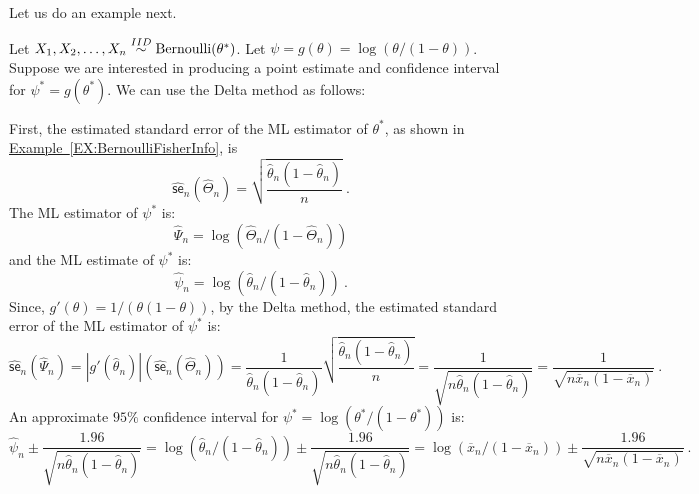 Let us do an example next.
\begin{example}
Let $X_1,X_2,\ldots,X_n \overset{IID}{\sim} \mbox{{\rm Bernoulli}}(\theta^*)$.  Let $\psi=g(\theta)=\log(\theta/(1-\theta))$.  Suppose we are interested in producing a point estimate and confidence interval for $\psi^*=g(\theta^*)$.  We can use the Delta method as follows: 

First, the estimated standard error of the ML estimator of $\theta^*$, as shown in \hyperref[EX:BernoulliFisherInfo]{Example~\ref*{EX:BernoulliFisherInfo}}, is
\[
\widehat{\mathsf{se}}_n(\widehat{\Theta}_n) = \sqrt{\frac{\widehat{\theta}_n (1-\widehat{\theta}_n)}{n}} \ .
\]
The ML estimator of $\psi^*$ is:
$$\widehat{\Psi}_n=\log(\widehat{\Theta}_n / (1-\widehat{\Theta}_n))$$ 
and the ML estimate of $\psi^*$ is:
$$\widehat{\psi}_n=\log(\widehat{\theta}_n / (1-\widehat{\theta}_n)) \ .$$
Since, $g'(\theta) = 1/(\theta (1-\theta))$, by the Delta method, the estimated standard error of the ML estimator of $\psi^*$ is:
\[
\widehat{\mathsf{se}}_n(\widehat{\Psi}_n) = |g'(\widehat{\theta}_n)| (\widehat{\mathsf{se}}_n(\widehat{\Theta}_n))
= \frac{1}{\widehat{\theta}_n (1-\widehat{\theta}_n)} \sqrt{\frac{\widehat{\theta}_n (1-\widehat{\theta}_n)}{n}}
= \frac{1}{\sqrt{n\widehat{\theta}_n (1-\widehat{\theta}_n)}}
= \frac{1}{\sqrt{n \overline{x}_n (1-\overline{x}_n)}} \ .
\]
An approximate $95\%$ confidence interval for $\psi^*=\log(\theta^*/(1-\theta^*))$ is:
\[
\widehat{\psi}_n \pm \frac{1.96}{\sqrt{n \widehat{\theta}_n (1-\widehat{\theta}_n)}}
= \log(\widehat{\theta}_n / (1-\widehat{\theta}_n)) \pm \frac{1.96}{\sqrt{n \widehat{\theta}_n (1-\widehat{\theta}_n)}}
= \log(\overline{x}_n / (1-\overline{x}_n)) \pm \frac{1.96}{\sqrt{n \overline{x}_n (1-\overline{x}_n)}} \ .
\]
\end{example}


